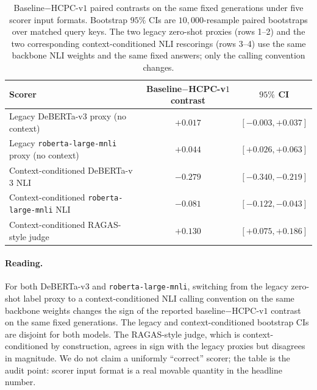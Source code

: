 \documentclass[11pt]{article}
\begin{document}
\begin{table}[!htb]
\centering
\caption{Baseline$-$HCPC-v$1$ paired contrasts on the same fixed
generations under five scorer input formats. Bootstrap $95\%$ CIs are
$10{,}000$-resample paired bootstraps over matched query keys. The
two legacy zero-shot proxies (rows 1--2) and the two corresponding
context-conditioned NLI rescorings (rows 3--4) use the same backbone
NLI weights and the same fixed answers; only the calling convention
changes.}
\label{tab:supp:context_conditioned_contrasts}
\footnotesize
\begin{tabular}{lcc}
\toprule
Scorer & Baseline$-$HCPC-v$1$ contrast & $95\%$ CI \\
\midrule
Legacy DeBERTa-v$3$ proxy (no context)            & $+0.017$ & $[-0.003, +0.037]$ \\
Legacy \texttt{roberta-large-mnli} proxy (no context) & $+0.044$ & $[+0.026, +0.063]$ \\
\addlinespace
Context-conditioned DeBERTa-v$3$ NLI              & $-0.279$ & $[-0.340, -0.219]$ \\
Context-conditioned \texttt{roberta-large-mnli} NLI & $-0.081$ & $[-0.122, -0.043]$ \\
\addlinespace
Context-conditioned RAGAS-style judge             & $+0.130$ & $[+0.075, +0.186]$ \\
\bottomrule
\end{tabular}
\end{table}

\paragraph{Reading.} For both DeBERTa-v$3$ and
\texttt{roberta-large-mnli}, switching from the legacy zero-shot label
proxy to a context-conditioned NLI calling convention on the same
backbone weights changes the sign of the reported baseline$-$HCPC-v$1$
contrast on the same fixed generations. The legacy and
context-conditioned bootstrap CIs are disjoint for both models. The
RAGAS-style judge, which is context-conditioned by construction,
agrees in sign with the legacy proxies but disagrees in magnitude. We
do not claim a uniformly ``correct'' scorer; the table is the audit
point: scorer input format is a real movable quantity in the headline
number.
\end{document}
